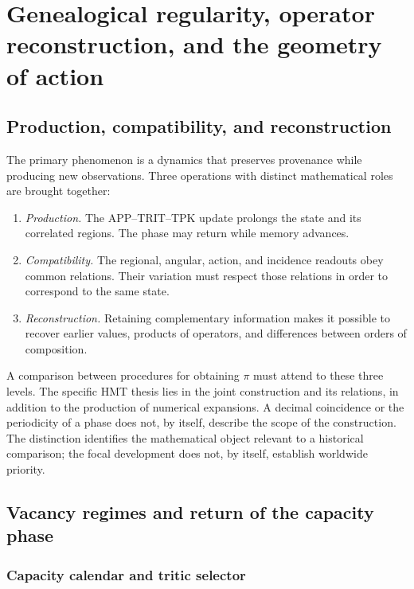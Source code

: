 \section{Genealogical regularity, operator reconstruction, and the geometry of action}
\label{md:restop:seccion}

\subsection{Production, compatibility, and reconstruction}
\label{md:restop:jerarquia}

The primary phenomenon is a dynamics that preserves provenance while producing
new observations. Three operations with distinct mathematical roles
are brought together:
\begin{enumerate}
 \item \emph{Production.} The APP--TRIT--TPK update prolongs the state
 and its correlated regions. The phase may return while memory
 advances.
 \item \emph{Compatibility.} The regional, angular, action,
 and incidence readouts obey common relations. Their variation must respect
 those relations in order to correspond to the same state.
 \item \emph{Reconstruction.} Retaining complementary information makes it possible
 to recover earlier values, products of operators, and differences
 between orders of composition.
\end{enumerate}
A comparison between procedures for obtaining $\pi$ must attend to these
three levels. The specific HMT thesis lies in the joint construction
and its relations, in addition to the production of numerical expansions.
A decimal coincidence or the periodicity of a phase does not, by itself,
describe the scope of the construction. The distinction identifies the
mathematical object relevant to a historical comparison; the focal development
does not, by itself, establish worldwide priority.

\subsection{Vacancy regimes and return of the capacity phase}
\label{md:restop:vacancias}

\subsubsection{Capacity calendar and tritic selector}
\label{md:restop:antecedentes-capacidad}

